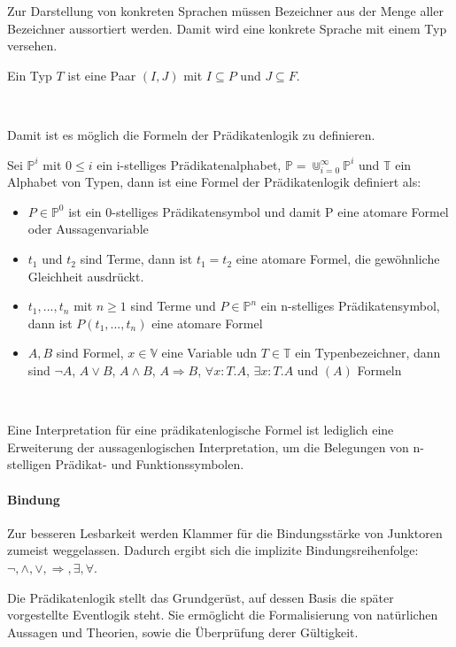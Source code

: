 Zur Darstellung von konkreten Sprachen müssen Bezeichner aus der Menge aller
Bezeichner aussortiert werden. Damit wird eine konkrete Sprache mit einem Typ
versehen.
\begin{defi}
  Ein Typ $T$ ist eine Paar $(I,J)$ mit $I\subseteq P$ und $J\subseteq F$.
\end{defi}~\cite{heinemann2013logik}

Damit ist es möglich die Formeln der Prädikatenlogik zu definieren.

\begin{defi}
  Sei $\mathbb{P}^i$ mit $0\le i$ ein i-stelliges Prädikatenalphabet,
  $\mathbb{P}=\Cup^{\infty}_{i=0}\mathbb{P}^i$ und $\mathbb{T}$ ein Alphabet von Typen,
  dann ist eine Formel der Prädikatenlogik definiert als:
  \begin{itemize}
  \item $P\in\mathbb{P}^0$ ist ein 0-stelliges Prädikatensymbol und damit P eine
    atomare Formel oder Aussagenvariable
  \item $t_1$ und $t_2$ sind Terme, dann ist $t_1 = t_2$ eine atomare Formel,
    die gewöhnliche Gleichheit ausdrückt.
  \item $t_1,...,t_n$ mit $n\geq1$ sind Terme und $P\in\mathbb{P}^n$ ein n-stelliges
    Prädikatensymbol, dann ist $P(t_1,...,t_n)$ eine atomare Formel
  \item $A,B$ sind Formel, $x\in\mathbb{V}$ eine Variable udn $T\in\mathbb{T}$ ein
    Typenbezeichner, dann sind $\neg A$, $A\vee B$, $A\wedge B$, $A\Rightarrow B$, $\forall x:T.A$, $\exists
    x:T.A$ und $(A)$ Formeln
  \end{itemize}
\end{defi}~\cite{kreitz1994automatisierte}

Eine Interpretation für eine prädikatenlogische Formel ist lediglich eine
Erweiterung der aussagenlogischen Interpretation, um die Belegungen von
n-stelligen Prädikat- und Funktionssymbolen.~\cite{heinemann2013logik}

\paragraph{Bindung}
Zur besseren Lesbarkeit werden Klammer für die Bindungsstärke von Junktoren
zumeist weggelassen. Dadurch ergibt sich die implizite Bindungsreihenfolge:
$\neg,\wedge,\vee,\Rightarrow,\exists,\forall$.~\cite{kreitz1994automatisierte}

Die Prädikatenlogik stellt das Grundgerüst, auf dessen Basis die später
vorgestellte Eventlogik steht. Sie ermöglicht die Formalisierung von natürlichen
Aussagen und Theorien, sowie die Überprüfung derer Gültigkeit.


